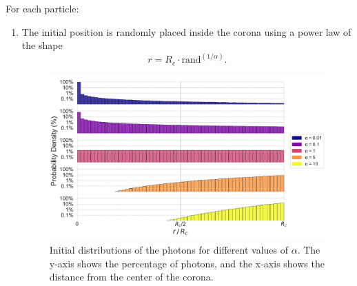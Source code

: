 For each particle:
\begin{enumerate}
\item The initial position is randomly placed inside the corona using a power law of the shape
\begin{equation}
r = R_c \cdot \text{rand}^{(1/\alpha)}.
\end{equation}
\begin{figure}[ht]
    \includegraphics[width=\textwidth]{Figures/InitialDistributions.pdf}
    \centering
    \caption{Initial distributions of the photons for different values of $\alpha$. The y-axis shows the percentage of photons, and the x-axis shows the distance from the center of the corona.}
    \label{fig:initial_distributions}
\end{figure}


\end{enumerate}
